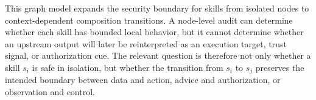 \documentclass{article}
\begin{document}
This graph model expands the security boundary for skills from isolated nodes to context-dependent composition transitions. A node-level audit can determine whether each skill has bounded local behavior, but it cannot determine whether an upstream output will later be reinterpreted as an execution target, trust signal, or authorization cue. The relevant question is therefore not only whether a skill \(s_i\) is safe in isolation, but whether the transition from \(s_i\) to \(s_j\) preserves the intended boundary between data and action, advice and authorization, or observation and control.


\end{document}
